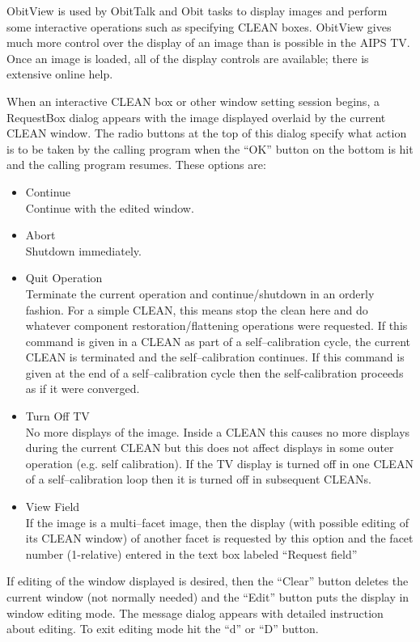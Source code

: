 \documentclass[11pt]{report}
\begin{document}
ObitView is used by ObitTalk and Obit tasks to display images and
perform some interactive operations such as specifying CLEAN boxes.
ObitView gives much more control over the display of an image than is
possible in the AIPS TV.
Once an image is loaded, all of the display controls are available;
there is extensive online help.

When an interactive CLEAN box or other window setting session begins,
a RequestBox dialog appears with the image displayed overlaid by the
current CLEAN window.
The radio buttons at the top of this dialog specify what action is to
be taken by the calling program when the ``OK'' button on the bottom
is hit and the calling program resumes.
These options are:
\begin{itemize}
\item Continue\\
Continue with the edited window.
\item Abort\\
Shutdown immediately.
\item Quit Operation\\
Terminate the current operation and continue/shutdown in an orderly
fashion.
For a simple CLEAN, this means stop the clean here and do whatever
component restoration/flattening operations were requested.
If this command is given in a CLEAN as part of a self--calibration
cycle, the current CLEAN is terminated and the self--calibration
continues.
If this command is given at the end of a self--calibration cycle then
the self-calibration proceeds as if it were converged.
\item Turn Off TV\\
No more displays of the image.
Inside a CLEAN this causes no more displays during the current CLEAN
but this does not affect displays in some outer operation (e.g. self
calibration). 
If the TV display is turned off in one CLEAN of a self--calibration
loop then it is turned off in subsequent CLEANs.
\item View Field\\
If the image is a multi--facet image, then the display (with possible
editing of its CLEAN window) of another facet is requested by this
option and the facet number (1-relative) entered in the text box labeled
``Request field'' 
\end{itemize}

If editing of the window displayed is desired, then the ``Clear''
button deletes the current window (not normally needed) and the ``Edit''
button puts the display in window editing mode.
The message dialog appears with detailed instruction about editing.
To exit editing mode hit the ``d'' or ``D'' button.
\end{document}
